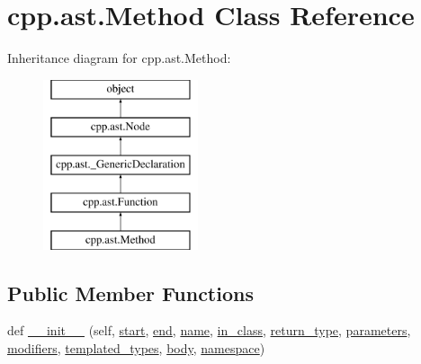 \hypertarget{classcpp_1_1ast_1_1Method}{}\section{cpp.\+ast.\+Method Class Reference}
\label{classcpp_1_1ast_1_1Method}
Inheritance diagram for cpp.\+ast.\+Method\+:\begin{figure}[H]
\begin{center}
\leavevmode
\includegraphics[height=5.000000cm]{classcpp_1_1ast_1_1Method}
\end{center}
\end{figure}
\subsection*{Public Member Functions}
\begin{DoxyCompactItemize}
\item 
def \mbox{\hyperlink{classcpp_1_1ast_1_1Method_aa3cbdc9c4b7e92b15fa6acea0dbf2322}{\+\_\+\+\_\+init\+\_\+\+\_\+}} (self, \mbox{\hyperlink{classcpp_1_1ast_1_1Node_a7b2aa97e6a049bb1a93aea48c48f1f44}{start}}, \mbox{\hyperlink{classcpp_1_1ast_1_1Node_a3c5e5246ccf619df28eca02e29d69647}{end}}, \mbox{\hyperlink{classcpp_1_1ast_1_1__GenericDeclaration_af774f4729dfd78d0538a6782fe8514c1}{name}}, \mbox{\hyperlink{classcpp_1_1ast_1_1Method_aa67244c3673afed43398b5d3e3fa6c1c}{in\+\_\+class}}, \mbox{\hyperlink{classcpp_1_1ast_1_1Function_af750fd788d7ab33163ee066534780212}{return\+\_\+type}}, \mbox{\hyperlink{classcpp_1_1ast_1_1Function_a0e61ef47af9cf2fd4402dbd8cab631ef}{parameters}}, \mbox{\hyperlink{classcpp_1_1ast_1_1Function_ad30eed435f1ff9ff34ade9cc0d7be121}{modifiers}}, \mbox{\hyperlink{classcpp_1_1ast_1_1Function_a57bb03218bade3240137a0d91c467cb6}{templated\+\_\+types}}, \mbox{\hyperlink{classcpp_1_1ast_1_1Function_a8e25e5016b23b38e32acf2df529c0650}{body}}, \mbox{\hyperlink{classcpp_1_1ast_1_1__GenericDeclaration_a8aee3f11b37449d54b42a78e0a689f46}{namespace}})
\end{DoxyCompactItemize}
